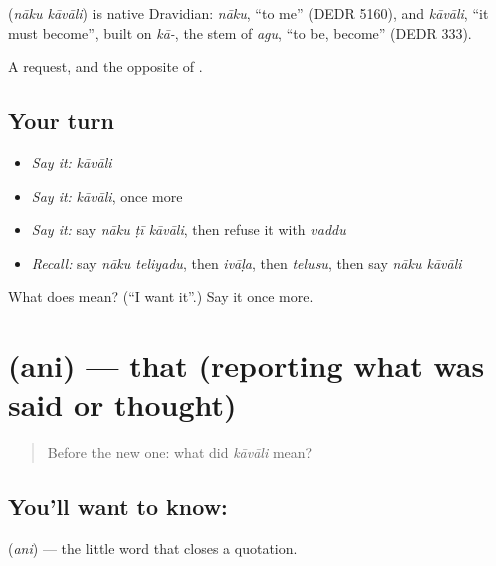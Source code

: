 \begin{cousinweb}
\textbf{ } (\emph{nāku kāvāli}) is native Dravidian: \emph{nāku}, \textquotedblleft{}to me\textquotedblright{} (DEDR 5160), and \emph{kāvāli}, \textquotedblleft{}it must become\textquotedblright{}, built on \emph{kā-}, the stem of \emph{agu}, \textquotedblleft{}to be, become\textquotedblright{} (DEDR 333).
\end{cousinweb}

\begin{grammarlens}[title={What you've built}]
A request, and the opposite of .
\end{grammarlens}

\subsection*{Your turn}
\begin{itemize}
\raggedright
  \item \emph{Say it:} \emph{kāvāli}
  \item \emph{Say it:} \emph{kāvāli}, once more
  \item \emph{Say it:} say \emph{nāku ṭī kāvāli}, then refuse it with \emph{vaddu}
  \item \emph{Recall:} say \emph{nāku teliyadu}, then \emph{ivāḷa}, then \emph{telusu}, then say \emph{nāku kāvāli}
\end{itemize}

\begin{tcolorbox}[breakable,colback=teal!4,colframe=teal!35!black,title={Before you move on}]
What does   mean? (\textquotedblleft{}I want it\textquotedblright{}.) Say it once more.
\end{tcolorbox}
\section[\texorpdfstring{\te{అని} (ani)}{అని (ani)}]{ (ani) — that (reporting what was said or thought)}

\label{lesson:TE-C80-that}



\begin{quote}
Before the new one: what did \emph{kāvāli} mean?
\end{quote}

\subsection*{You'll want to know: }
\textbf{} (\emph{ani}) — the little word that closes a quotation.

